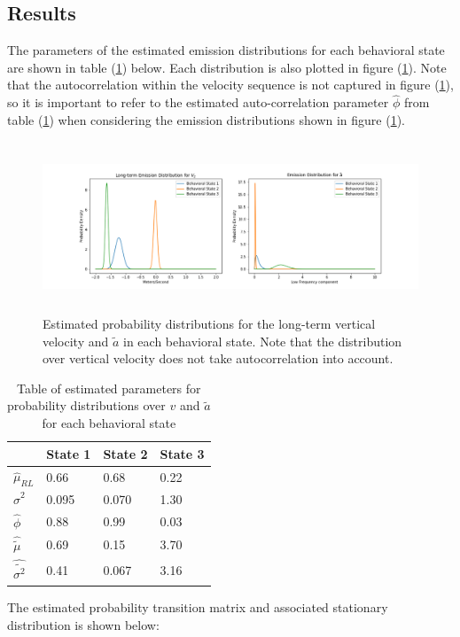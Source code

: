 \subsection{Results}

The parameters of the estimated emission distributions for each behavioral state are shown in table (\ref{table:emis_dist}) below. Each distribution is also plotted in figure (\ref{fig:emis_dist}). Note that the autocorrelation within the velocity sequence is not captured in figure (\ref{fig:emis_dist}), so it is important to refer to the estimated auto-correlation parameter $\hat \phi$ from table (\ref{table:emis_dist}) when considering the emission distributions shown in figure (\ref{fig:emis_dist}).
%
\begin{figure}[h!]
	\centering
	\includegraphics[height=2in]{../Plots/emis_dist.png}
	\caption{Estimated probability distributions for the long-term vertical velocity and $\tilde a$ in each behavioral state. Note that the distribution over vertical velocity does not take autocorrelation into account.}
	\label{fig:emis_dist}
\end{figure}
%
\begin{table}[h!]
	\centering
	\begin{tabular}{l|lll}
		& State 1 & State 2 & State 3 \\ \hline
		$\hat \mu_{RL}$        & 0.66    & 0.68    & 0.22    \\
		$\hat \sigma^2$        & 0.095   & 0.070   & 1.30    \\
		$\hat \phi$            & 0.88    & 0.99    & 0.03    \\ \hline
		$\hat \tilde \mu$      & 0.69    & 0.15    & 3.70    \\
		$\hat \tilde{\sigma^2}$ & 0.41    & 0.067   & 3.16   
	\end{tabular}
	\caption{Table of estimated parameters for probability distributions over $v$ and $\tilde a$ for each behavioral state}
	\label{table:emis_dist}
\end{table}
%
The estimated probability transition matrix and associated stationary distribution is shown below:

